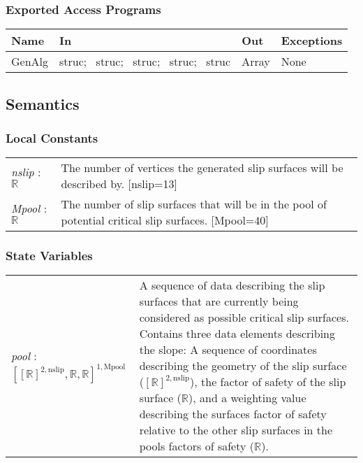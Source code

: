 \documentclass[12pt, titlepage]{article}
\begin{document}
\subsubsection{Exported Access Programs}
\begin{center}
\renewcommand*{\arraystretch}{1.5}
\begin{tabular}{| p{} | p{} | 
p{} | p{} |} \hline 

  \textbf{Name} & \textbf{In} & \textbf{Out} & \textbf{Exceptions}
  \\ \hline

  GenAlg & struc; ~\newline struc; ~\newline struc; ~\newline struc;
  ~\newline struc & Array & None \\ \hline
\end{tabular}
\end{center}

\subsection{Semantics}

\subsubsection{Local Constants}
\renewcommand*{\arraystretch}{1.5}
\begin{longtable}{p{} p{}}
  \textit{nslip} : $\mathbb{R}$ & The number of vertices the generated
  slip surfaces will be described by. [nslip=13] \\

  \textit{Mpool} : $\mathbb{R}$ & The number of slip surfaces that
  will be in the pool of potential critical slip surfaces. [Mpool=40]
\end{longtable}

\subsubsection{State Variables}
\renewcommand*{\arraystretch}{1.5}
\begin{longtable}{p{} p{}}
  \textit{pool} : $[[\mathbb{R}]^{2,\text{nslip}}, \mathbb{R},
    \mathbb{R}]^{1,\text{Mpool}}$ & A sequence of data describing the
  slip surfaces that are currently being considered as possible
  critical slip surfaces. Contains three data elements describing the
  slope: A sequence of coordinates describing the geometry of the slip
  surface ($[\mathbb{R}]^{2,\text{nslip}}$), the factor of safety of
  the slip surface ($\mathbb{R}$), and a weighting value describing
  the surfaces factor of safety relative to the other slip surfaces in
  the pools factors of safety ($\mathbb{R}$). \\
\end{longtable}
\end{document}

